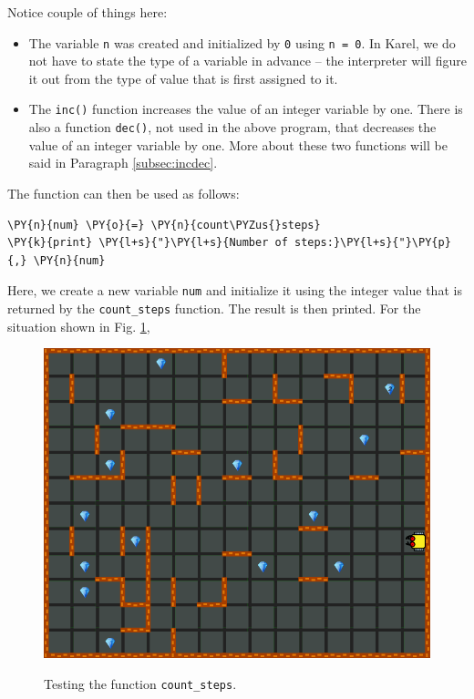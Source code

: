 \noindent
Notice couple of things here:
\begin{itemize}
\item The variable {\tt n} was created and initialized by {\tt 0} using {\tt n = 0}. In
      Karel, we do not have to state the type of a variable in advance -- the interpreter 
      will figure it out from the type of value that is first assigned to it.  
\item The {\tt inc()} function increases the value of an integer variable by one. 
      There is also a function {\tt dec()}, not used in the above program, that decreases 
      the value of an integer variable by one. More about these two functions will be said 
      in Paragraph \ref{subsec:incdec}.
\end{itemize}
The function can then be used as follows:\\

\begin{bbox}
\begin{Verbatim}[commandchars=\\\{\}]
\PY{n}{num} \PY{o}{=} \PY{n}{count\PYZus{}steps}
\PY{k}{print} \PY{l+s}{"}\PY{l+s}{Number of steps:}\PY{l+s}{"}\PY{p}{,} \PY{n}{num} 
\end{Verbatim}
\end{bbox}
\vspace{6mm}

\noindent
Here, we create a new variable {\tt num} and initialize it using the 
integer value that is returned by the {\tt count\_steps} function.
The result is then printed. For the situation shown in Fig. \ref{fig:cf-1},
\newpage

\begin{figure}[!ht]
\begin{center}
\includegraphics[height=0.4\textwidth]{img/maze-new-1.png}
\vspace{-0mm}
\caption{Testing the function {\tt count\_steps}.}
\vspace{-1cm}
\label{fig:cf-1}
\end{center}
\end{figure}


